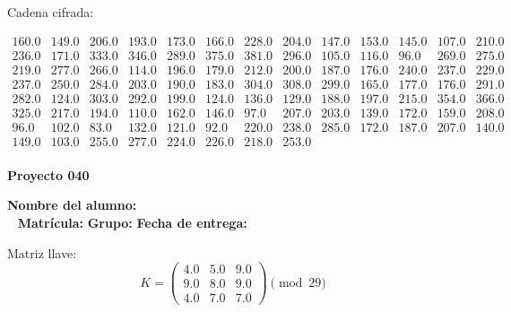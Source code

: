 \documentclass[12pt]{article}
\begin{document}
Cadena cifrada:
\begin{center}
$\begin{array}{lllllllllllll}
160.0 & 149.0 & 206.0 & 193.0 & 173.0 & 166.0 & 228.0 & 204.0 & 147.0 & 153.0 & 145.0 & 107.0 & 210.0\\
236.0 & 171.0 & 333.0 & 346.0 & 289.0 & 375.0 & 381.0 & 296.0 & 105.0 & 116.0 & 96.0 & 269.0 & 275.0\\
219.0 & 277.0 & 266.0 & 114.0 & 196.0 & 179.0 & 212.0 & 200.0 & 187.0 & 176.0 & 240.0 & 237.0 & 229.0\\
237.0 & 250.0 & 284.0 & 203.0 & 190.0 & 183.0 & 304.0 & 308.0 & 299.0 & 165.0 & 177.0 & 176.0 & 291.0\\
282.0 & 124.0 & 303.0 & 292.0 & 199.0 & 124.0 & 136.0 & 129.0 & 188.0 & 197.0 & 215.0 & 354.0 & 366.0\\
325.0 & 217.0 & 194.0 & 110.0 & 162.0 & 146.0 & 97.0 & 207.0 & 203.0 & 139.0 & 172.0 & 159.0 & 208.0\\
96.0 & 102.0 & 83.0 & 132.0 & 121.0 & 92.0 & 220.0 & 238.0 & 285.0 & 172.0 & 187.0 & 207.0 & 140.0\\
149.0 & 103.0 & 255.0 & 277.0 & 224.0 & 226.0 & 218.0 & 253.0\\
\end{array}$
\end{center}

\newpage


\textbf{Proyecto 040}

\textbf{Nombre del alumno:} \underline{\hspace{13cm}}\\\
\vspace{1cm}
\textbf{Matrícula:} \underline{\hspace{4cm}} \hspace{1cm}
\textbf{Grupo:} \underline{\hspace{2cm}}
\textbf{Fecha de entrega:} \underline{\hspace{2cm}}

\medskip

Matriz llave:
\[
K = \begin{pmatrix}
4.0 & 5.0 & 9.0\\
9.0 & 8.0 & 9.0\\
4.0 & 7.0 & 7.0
\end{pmatrix} \pmod{29}
\]
\end{document}

